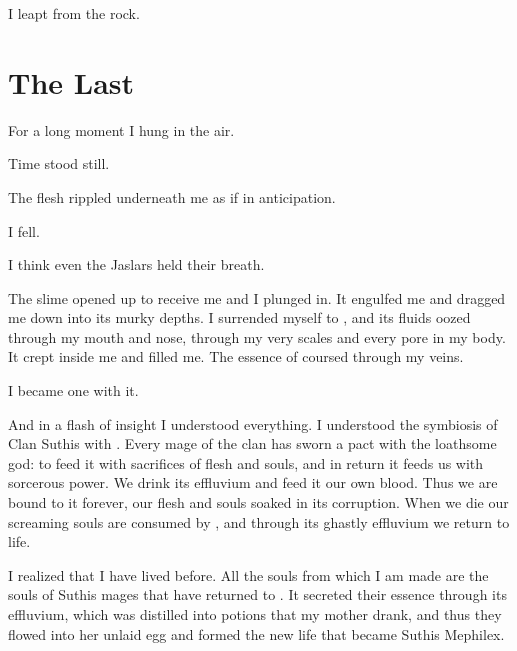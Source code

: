 \documentclass
  [a4paper,
   12pt,
   oneside
  ]%
  {article}
\begin{document}

I leapt from the rock. 









\section{The Last \Arcanum}
For a long moment I hung in the air. 

Time stood still. 

The flesh rippled underneath me as if in anticipation. 

I fell. 

I think even the Jaslars held their breath. 

The slime opened up to receive me and I plunged in.
It engulfed me and dragged me down into its murky depths.
I surrended myself to \Ubloth, and its fluids oozed through my mouth and nose, through my very scales and every pore in my body.
It crept inside me and filled me. 
The essence of \Ubloth coursed through my veins.

I became one with it. 

And in a flash of insight I understood everything. 
I understood the symbiosis of Clan Suthis with \Ubloth. 
Every mage of the clan has sworn a pact with the loathsome god: to feed it with sacrifices of flesh and souls, and in return it feeds us with sorcerous power.  
We drink its effluvium and feed it our own blood. 
Thus we are bound to it forever, our flesh and souls soaked in its corruption. 
When we die our screaming souls are consumed by \Ubloth, and through its ghastly effluvium we return to life. 

% 

I realized that I have lived before. 
All the souls from which I am made are the souls of Suthis mages that have returned to \Ubloth.
It secreted their essence through its effluvium, which was distilled into potions that my mother drank, and thus they flowed into her unlaid egg and formed the new life that became Suthis Mephilex. 
\end{document}
